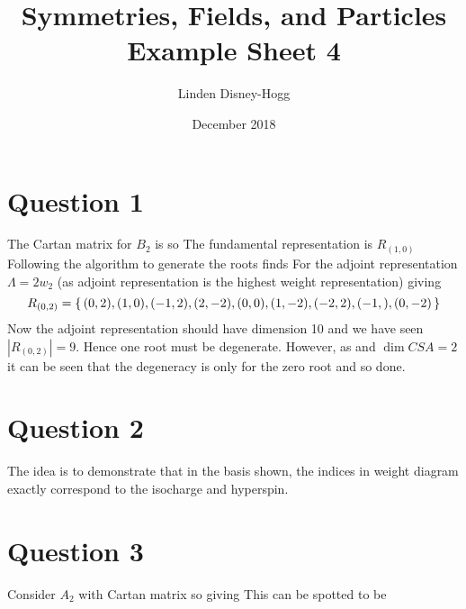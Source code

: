 \documentclass{article}
\title{Symmetries, Fields, and Particles Example Sheet 4}
\author{Linden Disney-Hogg}
\date{December 2018}
\begin{document}
\maketitle
\tableofcontents

\section{Question 1} 
The Cartan matrix for $B_2$ is 
so 
The fundamental representation is $R_{(1,0)}$
Following the algorithm to generate the roots finds 
For the adjoint representation $\Lambda = 2w_2$ (as adjoint representation is the highest weight representation) giving 
\[
R_{(0,2)} = \set{(0,2),(1,0),(-1,2),(2,-2),(0,0),(1,-2),(-2,2),(-1,),(0,-2)}
\]
Now the adjoint representation should have dimension 10 and we have seen $|R_{(0,2)}|=9$. Hence one root must be degenerate. However, as 
and $\dim CSA  = 2$ it can be seen that the degeneracy is only for the zero root and so done. 

\section{Question 2}
The idea is to demonstrate that in the basis shown, the indices in weight diagram exactly correspond to the isocharge and hyperspin. 
\section{Question 3}
Consider $A_2$ with Cartan matrix 
so 
giving 
This can be spotted to be 
\end{document}
